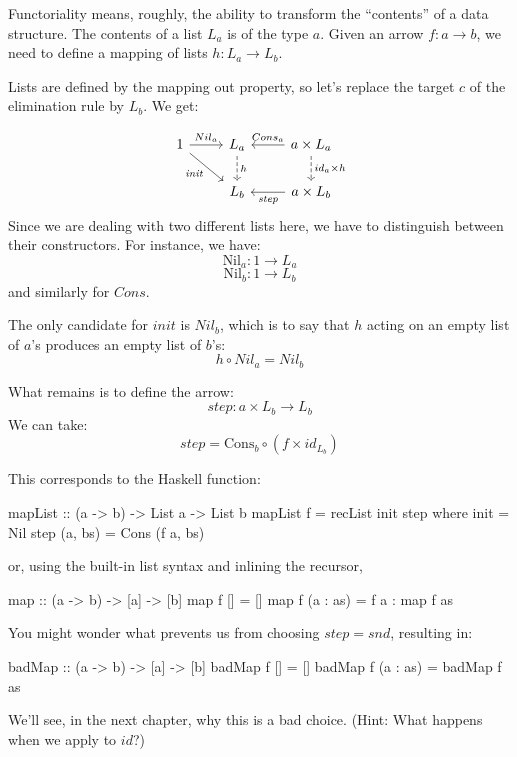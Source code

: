 \documentclass[DaoFP]{subfiles}
\begin{document}
Functoriality means, roughly, the ability to transform the ``contents'' of a data structure. The contents of a list $L_a$ is of the type $a$. Given an arrow $f \colon a \to b$, we need to define a mapping of lists $h \colon L_a \to L_b$.

Lists are defined by the mapping out property, so let's replace the target $c$ of the elimination rule by $L_b$. We get:

\[
 \begin{tikzcd}
 1
 \arrow[r, "Nil_a"]
 \arrow[rd, "\mathit{init}"']
 &L_a
\arrow[d, dashed, "h"]
&a \times L_a
  \arrow[l, "Cons_a"']
\arrow[d, dashed, "id_a \times h"]
\\
& L_b
& a \times L_b
\arrow[l, "\mathit{step}"]
  \end{tikzcd}
\]
Since we are dealing with two different lists here, we have to distinguish between their constructors. For instance, we have: 
\[\text{Nil}_a \colon 1 \to L_a \]
\[\text{Nil}_b \colon 1 \to L_b \]
and similarly for $Cons$.

The only candidate for $\mathit{init}$ is $Nil_b$, which is to say that $h$ acting on an empty list of $a$'s produces an empty list of $b$'s:
\[ h \circ Nil_a = Nil_b \]

What remains is to define the arrow:
\[\mathit{step} \colon a \times L_b \to L_b\]
We can take:
\[ \mathit{step} = \text{Cons}_b \circ (f \times id_{L_b}) \]

This corresponds to the Haskell function:

\begin{haskell}
mapList :: (a -> b) -> List a -> List b
mapList f = recList init step
  where
    init = Nil
    step (a, bs) = Cons (f a, bs)
\end{haskell}
or, using the built-in list syntax and inlining the recursor,
\begin{haskell}
map :: (a -> b) -> [a] -> [b]
map f [] = []
map f (a : as) = f a : map f as
\end{haskell}

You might wonder what prevents us from choosing $\mathit{step} = \mathit{snd}$, resulting in:
\begin{haskell}
badMap :: (a -> b) -> [a] -> [b]
badMap f [] = []
badMap f (a : as) = badMap f as
\end{haskell}
We'll see, in the next chapter, why this is a bad choice. (Hint: What happens when we apply  to $id$?)
\end{document}
